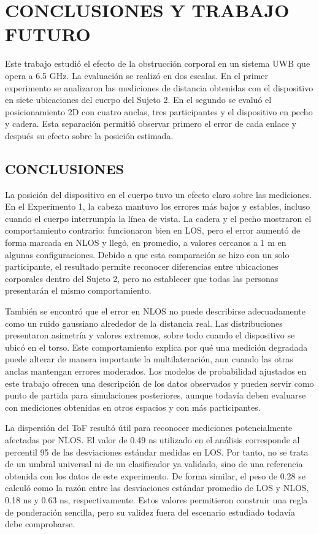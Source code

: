 \chapter{CONCLUSIONES Y TRABAJO FUTURO}
\label{ch:conclusiones}

Este trabajo estudió el efecto de la obstrucción corporal en un sistema UWB que opera a 6.5 GHz. La evaluación se realizó en dos escalas. En el primer experimento se analizaron las mediciones de distancia obtenidas con el dispositivo en siete ubicaciones del cuerpo del Sujeto 2. En el segundo se evaluó el posicionamiento 2D con cuatro anclas, tres participantes y el dispositivo en pecho y cadera. Esta separación permitió observar primero el error de cada enlace y después su efecto sobre la posición estimada.

\section{CONCLUSIONES}
\label{sec:conclusiones_principales}
\label{sec:contribuciones}

La posición del dispositivo en el cuerpo tuvo un efecto claro sobre las mediciones. En el Experimento 1, la cabeza mantuvo los errores más bajos y estables, incluso cuando el cuerpo interrumpía la línea de vista. La cadera y el pecho mostraron el comportamiento contrario: funcionaron bien en LOS, pero el error aumentó de forma marcada en NLOS y llegó, en promedio, a valores cercanos a 1 m en algunas configuraciones. Debido a que esta comparación se hizo con un solo participante, el resultado permite reconocer diferencias entre ubicaciones corporales dentro del Sujeto 2, pero no establecer que todas las personas presentarán el mismo comportamiento.

También se encontró que el error en NLOS no puede describirse adecuadamente como un ruido gaussiano alrededor de la distancia real. Las distribuciones presentaron asimetría y valores extremos, sobre todo cuando el dispositivo se ubicó en el torso. Este comportamiento explica por qué una medición degradada puede alterar de manera importante la multilateración, aun cuando las otras anclas mantengan errores moderados. Los modelos de probabilidad ajustados en este trabajo ofrecen una descripción de los datos observados y pueden servir como punto de partida para simulaciones posteriores, aunque todavía deben evaluarse con mediciones obtenidas en otros espacios y con más participantes.

La dispersión del ToF resultó útil para reconocer mediciones potencialmente afectadas por NLOS. El valor de 0.49 ns utilizado en el análisis corresponde al percentil 95 de las desviaciones estándar medidas en LOS. Por tanto, no se trata de un umbral universal ni de un clasificador ya validado, sino de una referencia obtenida con los datos de este experimento. De forma similar, el peso de 0.28 se calculó como la razón entre las desviaciones estándar promedio de LOS y NLOS, 0.18 ns y 0.63 ns, respectivamente. Estos valores permitieron construir una regla de ponderación sencilla, pero su validez fuera del escenario estudiado todavía debe comprobarse.

